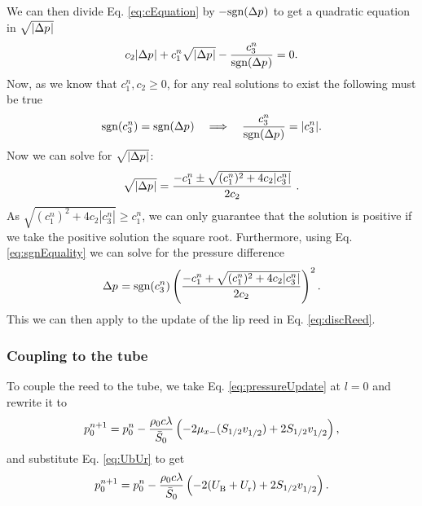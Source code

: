 \documentclass[dvipsnames]{article}
\begin{document}
We can then divide Eq. \eqref{eq:cEquation} by $-\text{sgn}(\Delta p^{})$ to get a quadratic equation in $\sqrt{|\Delta p^{}|}$
\begin{equation}
    c_2|\Delta p^{}| + c_1^n\sqrt{|\Delta p^{}|} - \frac{c_3^n}{\text{sgn}(\Delta p^{})} = 0.
\end{equation}
Now, as we know that $c_1^n, c_2 \geq 0$, for any real solutions to exist the following must be true
\begin{equation}\label{eq:sgnEquality}
    \text{sgn}(c_3^n) = \text{sgn}(\Delta p^{}) \quad \Longrightarrow \quad \frac{c_3^n}{\text{sgn}(\Delta p^{})} = |c_3^n|.
\end{equation}
Now we can solve for $\sqrt{|\Delta p^{}|}$:
\begin{equation}
    \sqrt{|\Delta p^{}|} = \frac{-c_1^n \pm \sqrt{(c^n_1)^2+4c_2|c_3^n|}}{2c_2}\ .
\end{equation}
As $\sqrt{(c_1^n)^2 + 4c_2|c_3^n|} \geq c_1^n$, we can only guarantee that the solution is positive if we take the positive solution the square root. Furthermore, using Eq. \eqref{eq:sgnEquality} we can solve for the pressure difference
\begin{equation}\label{eq:pressureDiff}
    \Delta p^{} = \text{sgn}(c_3^n)\left(\frac{-c_1^n + \sqrt{(c^n_1)^2+4c_2|c_3^n|}}{2c_2}\right)^2.
\end{equation}
This we can then apply to the update of the lip reed in Eq. \eqref{eq:discReed}. 

\subsubsection{Coupling to the tube}
To couple the reed to the tube, we take Eq. \eqref{eq:pressureUpdate} at $l=0$ and rewrite it to
\begin{equation}
    p^{n+1}_0 = p_0^n - \frac{\rho_0c\lambda}{\bar S_0}\left(-2\mu_{x-}(S_{1/2}v_{1/2}^{}) + 2 S_{1/2}v_{1/2}^{}\right),
\end{equation}
and substitute Eq. \eqref{eq:UbUr} to get
\begin{equation}\label{eq:pressureCoupled}
    p^{n+1}_0 = p_0^n - \frac{\rho_0c\lambda}{\bar S_0}\left(-2(U_\text{B}^{} + U_\text{r}^{}) + 2 S_{1/2}v_{1/2}^{}\right).
\end{equation}
\end{document}
